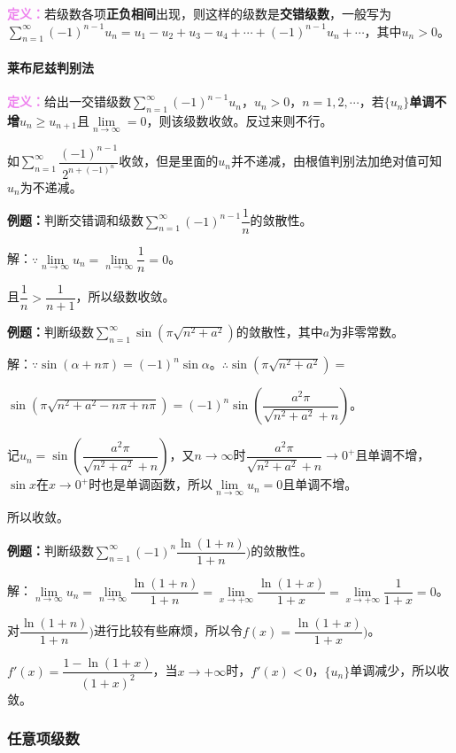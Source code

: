 \documentclass[UTF8, 12pt]{ctexart}
\begin{document}
\textcolor{violet}{\textbf{定义：}}若级数各项\textbf{正负相间}出现，则这样的级数是\textbf{交错级数}，一般写为$\sum\limits_{n=1}^\infty(-1)^{n-1}u_n=u_1-u_2+u_3-u_4+\cdots+(-1)^{n-1}u_n+\cdots$，其中$u_n>0$。

\paragraph{莱布尼兹判别法} \leavevmode \medskip

\textcolor{violet}{\textbf{定义：}}给出一交错级数$\sum\limits_{n=1}^\infty(-1)^{n-1}u_n$，$u_n>0$，$n=1,2,\cdots$，若$\{u_n\}$\textbf{单调不增}$u_n\geqslant u_{n+1}$且$\lim\limits_{n\to\infty}=0$，则该级数收敛。反过来则不行。

如$\sum\limits_{n=1}^\infty\dfrac{(-1)^{n-1}}{2^{n+(-1)^n}}$收敛，但是里面的$u_n$并不递减，由根值判别法加绝对值可知$u_n$为不递减。

\textbf{例题：}判断交错调和级数$\sum\limits_{n=1}^\infty(-1)^{n-1}\dfrac{1}{n}$的敛散性。

解：$\because\lim\limits_{n\to\infty}u_n=\lim\limits_{n\to\infty}\dfrac{1}{n}=0$。

且$\dfrac{1}{n}>\dfrac{1}{n+1}$，所以级数收敛。

\textbf{例题：}判断级数$\sum\limits_{n=1}^\infty\sin(\pi\sqrt{n^2+a^2})$的敛散性，其中$a$为非零常数。

解：$\because\sin(\alpha+n\pi)=(-1)^n\sin\alpha$。$\therefore\sin(\pi\sqrt{n^2+a^2})=$

$\sin(\pi\sqrt{n^2+a^2-n\pi+n\pi})=(-1)^n\sin\left(\dfrac{a^2\pi}{\sqrt{n^2+a^2}+n}\right)$。

记$u_n=\sin\left(\dfrac{a^2\pi}{\sqrt{n^2+a^2}+n}\right)$，又$n\to\infty$时$\dfrac{a^2\pi}{\sqrt{n^2+a^2}+n}\to0^+$且单调不增，$\sin x$在$x\to0^+$时也是单调函数，所以$\lim\limits_{n\to\infty}u_n=0$且单调不增。

所以收敛。

\textbf{例题：}判断级数$\sum\limits_{n=1}^\infty(-1)^n\dfrac{\ln(1+n)}{1+n})$的敛散性。

解：$\lim\limits_{n\to\infty}u_n=\lim\limits_{n\to\infty}\dfrac{\ln(1+n)}{1+n}=\lim\limits_{x\to+\infty}\dfrac{\ln(1+x)}{1+x}=\lim\limits_{x\to+\infty}\dfrac{1}{1+x}=0$。

对$\dfrac{\ln(1+n)}{1+n})$进行比较有些麻烦，所以令$f(x)=\dfrac{\ln(1+x)}{1+x})$。

$f'(x)=\dfrac{1-\ln(1+x)}{(1+x)^2}$，当$x\to+\infty$时，$f'(x)<0$，$\{u_n\}$单调减少，所以收敛。

\subsubsection{任意项级数}
\end{document}
